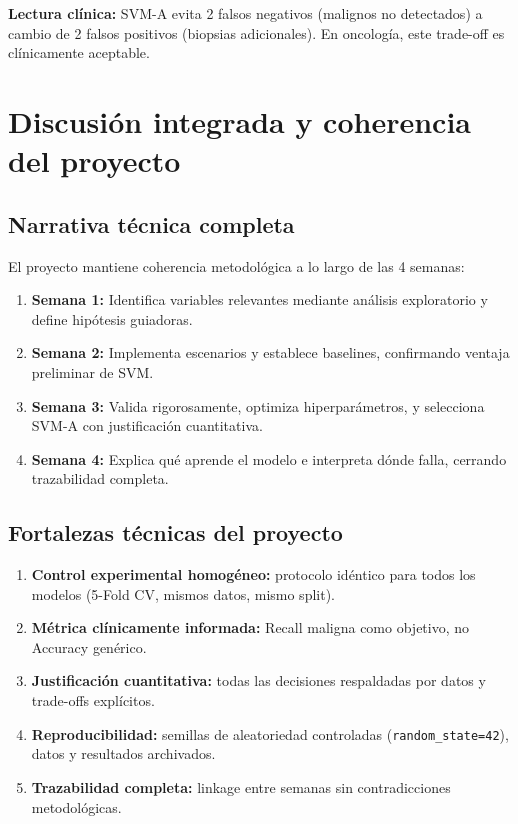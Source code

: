 \documentclass[11pt,a4paper]{article}
\begin{document}
\textbf{Lectura clínica:} SVM-A evita 2 falsos negativos (malignos no detectados) a cambio de 2 falsos positivos (biopsias adicionales). En oncología, este trade-off es clínicamente aceptable.

\section{Discusión integrada y coherencia del proyecto}

\subsection{Narrativa técnica completa}

El proyecto mantiene coherencia metodológica a lo largo de las 4 semanas:

\begin{enumerate}[leftmargin=1.4cm]
\item \textbf{Semana 1:} Identifica variables relevantes mediante análisis exploratorio y define hipótesis guiadoras.
\item \textbf{Semana 2:} Implementa escenarios y establece baselines, confirmando ventaja preliminar de SVM.
\item \textbf{Semana 3:} Valida rigorosamente, optimiza hiperparámetros, y selecciona SVM-A con justificación cuantitativa.
\item \textbf{Semana 4:} Explica qué aprende el modelo e interpreta dónde falla, cerrando trazabilidad completa.
\end{enumerate}

\subsection{Fortalezas técnicas del proyecto}

\begin{enumerate}[leftmargin=1.4cm]
\item \textbf{Control experimental homogéneo:} protocolo idéntico para todos los modelos (5-Fold CV, mismos datos, mismo split).
\item \textbf{Métrica clínicamente informada:} Recall maligna como objetivo, no Accuracy genérico.
\item \textbf{Justificación cuantitativa:} todas las decisiones respaldadas por datos y trade-offs explícitos.
\item \textbf{Reproducibilidad:} semillas de aleatoriedad controladas (\texttt{random\_state=42}), datos y resultados archivados.
\item \textbf{Trazabilidad completa:} linkage entre semanas sin contradicciones metodológicas.
\end{enumerate}
\end{document}
